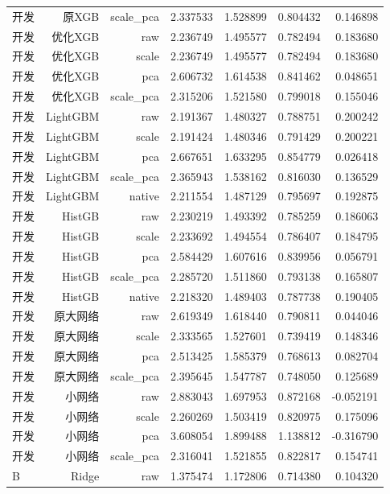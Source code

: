 \begin{longtable}{lrrrrrr}
开发 & 原XGB & scale\_pca & 2.337533 & 1.528899 & 0.804432 & 0.146898 \\
开发 & 优化XGB & raw & 2.236749 & 1.495577 & 0.782494 & 0.183680 \\
开发 & 优化XGB & scale & 2.236749 & 1.495577 & 0.782494 & 0.183680 \\
开发 & 优化XGB & pca & 2.606732 & 1.614538 & 0.841462 & 0.048651 \\
开发 & 优化XGB & scale\_pca & 2.315206 & 1.521580 & 0.799018 & 0.155046 \\
开发 & LightGBM & raw & 2.191367 & 1.480327 & 0.788751 & 0.200242 \\
开发 & LightGBM & scale & 2.191424 & 1.480346 & 0.791429 & 0.200221 \\
开发 & LightGBM & pca & 2.667651 & 1.633295 & 0.854779 & 0.026418 \\
开发 & LightGBM & scale\_pca & 2.365943 & 1.538162 & 0.816030 & 0.136529 \\
开发 & LightGBM & native & 2.211554 & 1.487129 & 0.795697 & 0.192875 \\
开发 & HistGB & raw & 2.230219 & 1.493392 & 0.785259 & 0.186063 \\
开发 & HistGB & scale & 2.233692 & 1.494554 & 0.786407 & 0.184795 \\
开发 & HistGB & pca & 2.584429 & 1.607616 & 0.839956 & 0.056791 \\
开发 & HistGB & scale\_pca & 2.285720 & 1.511860 & 0.793138 & 0.165807 \\
开发 & HistGB & native & 2.218320 & 1.489403 & 0.787738 & 0.190405 \\
开发 & 原大网络 & raw & 2.619349 & 1.618440 & 0.790811 & 0.044046 \\
开发 & 原大网络 & scale & 2.333565 & 1.527601 & 0.739419 & 0.148346 \\
开发 & 原大网络 & pca & 2.513425 & 1.585379 & 0.768613 & 0.082704 \\
开发 & 原大网络 & scale\_pca & 2.395645 & 1.547787 & 0.748050 & 0.125689 \\
开发 & 小网络 & raw & 2.883043 & 1.697953 & 0.872168 & -0.052191 \\
开发 & 小网络 & scale & 2.260269 & 1.503419 & 0.820975 & 0.175096 \\
开发 & 小网络 & pca & 3.608054 & 1.899488 & 1.138812 & -0.316790 \\
开发 & 小网络 & scale\_pca & 2.316041 & 1.521855 & 0.822817 & 0.154741 \\
B & Ridge & raw & 1.375474 & 1.172806 & 0.714380 & 0.104320 \\

\end{longtable}
